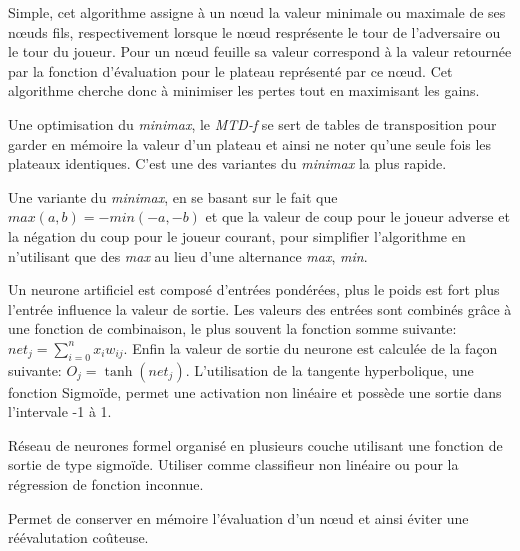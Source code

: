 \begin{description}[style=nextline]
		\item[Minimax] Simple, cet algorithme assigne à un n\oe{}ud la valeur minimale ou maximale de ses
		n\oe{}uds fils, respectivement lorsque le n\oe{}ud resprésente le tour de l'adversaire ou le tour
		du joueur. Pour un n\oe{}ud feuille sa valeur correspond à la valeur retournée par la fonction
		d'évaluation pour le plateau représenté par ce n\oe{}ud. Cet algorithme cherche donc à minimiser
		les pertes tout en maximisant les gains.

		\item[MTD-f] Une optimisation du \emph{minimax}, le \emph{MTD-f} se sert de tables de transposition
		pour garder en mémoire la valeur d'un plateau et ainsi ne noter qu'une seule fois les plateaux identiques.
		C'est une des variantes du \emph{minimax} la plus rapide.

		\item[Negamax] Une variante du \emph{minimax}, en se basant sur le fait
		que $max(a,b) = -min(-a,-b)$ et que la valeur de coup pour le joueur adverse et la négation du
		coup pour le joueur courant, pour simplifier l'algorithme en n'utilisant que des \emph{max}
		au lieu d'une alternance \emph{max}, \emph{min}.

		\item[Neurone] Un neurone artificiel est composé d'entrées pondérées, plus le poids est fort plus l'entrée
		influence la valeur de sortie. Les valeurs des entrées sont combinés grâce à une fonction de
		combinaison, le plus souvent la fonction somme suivante: $net_j = \sum\limits_{i=0}^n x_i  w_{ij}$.
		Enfin la valeur de sortie du neurone est calculée de la façon suivante: $O_j = \tanh{}(net_j)$.
		L'utilisation de la tangente hyperbolique, une fonction Sigmoïde, permet une activation non linéaire
		et possède une sortie dans l'intervale -1 à 1.

		\item[Perceptron multicouche] Réseau de neurones formel organisé en plusieurs couche utilisant une fonction de sortie
		de type sigmoïde. Utiliser comme classifieur non linéaire ou pour la régression de fonction inconnue.


		\item[Table de transposition] Permet de conserver en mémoire l'évaluation d'un n\oe{}ud et ainsi éviter une réévalutation
		coûteuse.
	\end{description}
